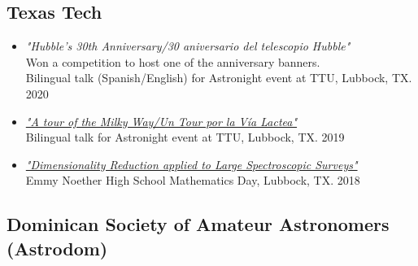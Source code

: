 \documentclass[letterpaper,10pt]{article}
\begin{document}
\subsection*{Texas Tech}

\begin{itemize}[label=$\blacktriangleright$]





	\item \textit{"Hubble's 30th Anniversary/30 aniversario del telescopio Hubble"} \\ Won a competition to host one of the anniversary banners. \\ Bilingual talk (Spanish/English) for Astronight event at TTU, Lubbock, TX. 2020


	\item \textit{\href{https://slides.com/mmarcano22/a-tour-of-the-milky-way-2\#/}{"A tour of the Milky Way/Un Tour por la V\'ia Lactea"}} \\ Bilingual talk for Astronight event at TTU, Lubbock, TX. 2019


	\item \textit{\href{http://manuelpm.me/PCASDSS/}{"Dimensionality Reduction applied to Large Spectroscopic Surveys"}} \\ Emmy Noether High School Mathematics Day, Lubbock, TX. 2018




\end{itemize}


\subsection*{Dominican Society of Amateur Astronomers (Astrodom)}
\end{document}
